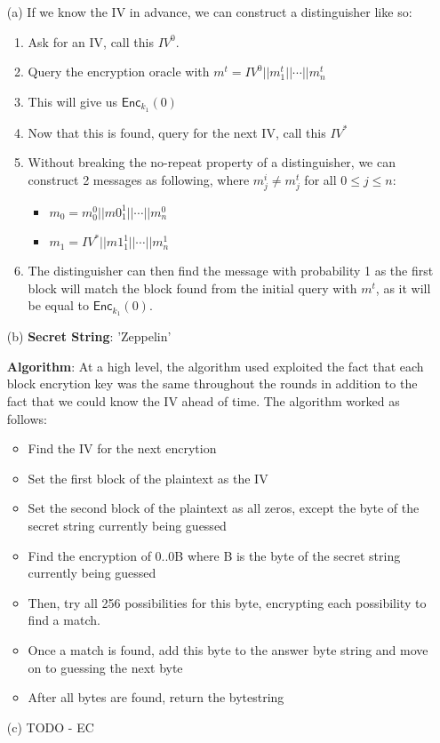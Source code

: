 \documentclass[11pt]{article}
\newcommand{\enc}{\textsf{Enc}}
\begin{document}
\begin{itemize}
\item[(a)] If we know the IV in advance, we can construct a distinguisher like so:
  \begin{enumerate}
    \item Ask for an IV, call this $IV^0$.
    \item Query the encryption oracle with $m^t = IV^0 || m^t_1 || \cdots || m^t_n$
    \item This will give us $\enc_{k_1}(0)$
    \item Now that this is found, query for the next IV, call this $IV^*$
    \item Without breaking the no-repeat property of a distinguisher, we can construct 
      2 messages as following, where $m^i_j \neq m^t_j$ for all $0\leq j \leq n$:
      \begin{itemize}
        \item $m_0 = m^0_0 || m0^1_1 || \cdots || m^0_n$
        \item $m_1 = IV^* || m1^1_1 || \cdots || m^1_n$
      \end{itemize}
    \item The distinguisher can then find the message with probability 1 as the first
      block will match the block found from the initial query with $m^t$, as it will be
      equal to $\enc_{k_1}(0)$.
  \end{enumerate}
\item[(b)] 
  \textbf{Secret String}: 
      'Zeppelin'

  \textbf{Algorithm}:
      At a high level, the algorithm used exploited the fact that each
      block encrytion key was the same throughout the rounds in addition to 
      the fact that we could know the IV ahead of time. The algorithm worked as follows:
  \begin{itemize}
    \item Find the IV for the next encrytion
    \item Set the first block of the plaintext as the IV
    \item Set the second block of the plaintext as all zeros, except the byte of
      the secret string currently being guessed
    \item Find the encryption of 0..0B where B is the byte of the secret string currently
      being guessed
    \item Then, try all 256 possibilities for this byte, encrypting each possibility to find 
      a match.
    \item Once a match is found, add this byte to the answer byte string and move on to 
      guessing the next byte
    \item After all bytes are found, return the bytestring
  \end{itemize}
\item[(c)] TODO - EC 

\end{itemize}
\end{document}
